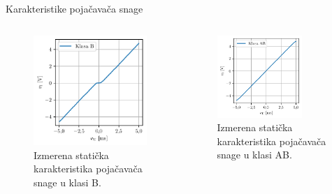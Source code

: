 \documentclass[aspectratio=169,xcolor=dvipsnames]{beamer}
\begin{document}
\begin{frame}{Karakteristike pojačavača snage}
	\begin{columns}[c]
    \begin{column}{.5\textwidth}
    \begin{figure}
        \centering
        \includegraphics[scale = 0.75]{fig/PABs.pdf}
        \caption{Izmerena statička karakteristika pojačavača snage u klasi B.}
    \end{figure}      
    \end{column}
    \begin{column}{.5\textwidth}
    \begin{figure}
        \centering
        \includegraphics[width=0.75\textwidth]{fig/PAABs.pdf}
        \caption{Izmerena statička karakteristika pojačavača snage u klasi AB.}
    \end{figure}
    \end{column}
\end{columns}
\end{frame}
\end{document}
